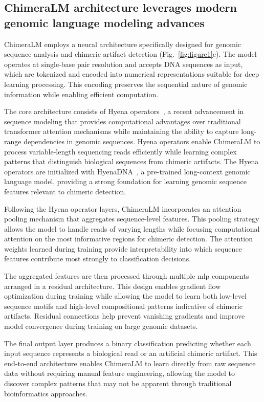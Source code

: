 \documentclass[pdflatex,sn-nature]{sn-jnl}%
\theoremstyle{thmstyleone}%
\theoremstyle{thmstyletwo}%
\theoremstyle{thmstylethree}%
\begin{document}
\subsection*{ChimeraLM architecture leverages modern genomic language modeling advances}

ChimeraLM employs a neural architecture specifically designed for genomic sequence analysis and chimeric artifact detection (Fig.~\ref{fig:figure1}c).
The model operates at single-base pair resolution and accepts DNA sequences as input, which are tokenized and encoded into numerical representations suitable for deep learning processing.
This encoding preserves the sequential nature of genomic information while enabling efficient computation.

The core architecture consists of Hyena operators~\cite{Poli2023HyenaHT}, a recent advancement in sequence modeling that provides computational advantages over traditional transformer attention mechanisms while maintaining the ability to capture long-range dependencies in genomic sequences.
Hyena operators enable ChimeraLM to process variable-length sequencing reads efficiently while learning complex patterns that distinguish biological sequences from chimeric artifacts.
The Hyena operators are initialized with HyenaDNA~\cite{nguyen2023hyenadna}, a pre-trained long-context genomic language model, providing a strong foundation for learning genomic sequence features relevant to chimeric detection.

Following the Hyena operator layers, ChimeraLM incorporates an attention pooling mechanism that aggregates sequence-level features.
This pooling strategy allows the model to handle reads of varying lengths while focusing computational attention on the most informative regions for chimeric detection.
The attention weights learned during training provide interpretability into which sequence features contribute most strongly to classification decisions.

The aggregated features are then processed through multiple \gls{mlp} components arranged in a residual architecture.
This design enables gradient flow optimization during training while allowing the model to learn both low-level sequence motifs and high-level compositional patterns indicative of chimeric artifacts.
Residual connections help prevent vanishing gradients and improve model convergence during training on large genomic datasets.

The final output layer produces a binary classification predicting whether each input sequence represents a biological read or an artificial chimeric artifact.
This end-to-end architecture enables ChimeraLM to learn directly from raw sequence data without requiring manual feature engineering, allowing the model to discover complex patterns that may not be apparent through traditional bioinformatics approaches.
\end{document}
